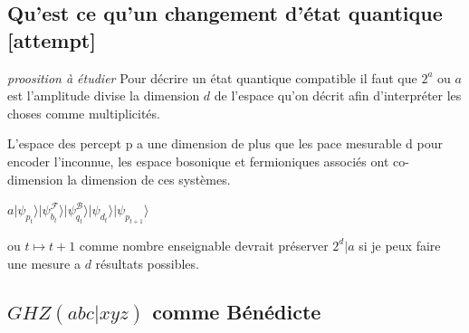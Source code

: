 \documentclass{article}
\newcommand{\ket}[1]{\ensuremath{|{#1}\rangle}}
\begin{document}
 \subsection{ Qu'est ce qu'un changement d'état quantique [attempt]}
 \emph{proosition à étudier}
 Pour décrire un état quantique compatible il faut que $2^{a}$ ou $a$ est l'amplitude divise la dimension $d$ de l'espace qu'on décrit afin d'interpréter les choses comme multiplicités.
 
 L'espace des percept p a une dimension de plus que les pace mesurable d pour encoder l'inconnue, les espace bosonique et fermioniques associés ont co-dimension la dimension de ces systèmes. 
 
 $a {\ket{ \psi_{p_t}}} {\ket {\psi_{b_t}^{\mathcal F}}} {\ket {\psi_{q_t}^\mathcal{B}}} \ket{\psi_{d_t}} \ket{ \psi_{p_{t+1}}}$  
 
 ou $t\mapsto t+1$ comme nombre enseignable devrait  préserver $2^d|a$ si je peux faire une mesure a $d$ résultats possibles.
 
\subsection{$GHZ (abc|xyz)$  comme Bénédicte}
\end{document}

